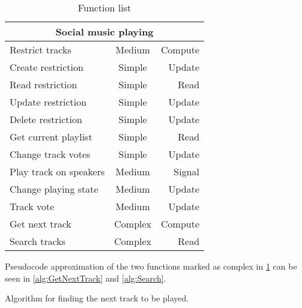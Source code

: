 \begin{table}[hbtp]
\centering
\begin{tabular}{lcr}
\toprule
\multicolumn{3}{c}{\textbf{Social music playing}} \\
\midrule
Restrict tracks                & Medium  & Compute \\
Create restriction             & Simple  & Update  \\
Read restriction               & Simple  & Read    \\
Update restriction             & Simple  & Update  \\
Delete restriction             & Simple  & Update  \\
Get current playlist           & Simple  & Read    \\
Change track votes             & Simple  & Update  \\
Play track on speakers         & Medium  & Signal  \\
Change playing state           & Medium  & Update  \\
Track vote                     & Medium  & Update  \\
Get next track                 & Complex & Compute \\
Search tracks                  & Complex & Read    \\
\bottomrule
\end{tabular}
\caption{Function list}
\label{table:functionlist}
\end{table}

Pseudocode approximation of the two functions marked as complex in \cref{table:functionlist} can be seen in \cref{alg:GetNextTrack} and \cref{alg:Search}.

\begin{algorithm}[htbp]
\caption{Algorithm for finding the next track to be played.}\label{alg:GetNextTrack}
\begin{algorithmic}[1]
		\EndIf{}
			\Else{} 
					\EndIf{}
				\EndIf{}
			\EndIf{}
		\EndFor{}
	\EndFunction{}
\end{algorithmic}
\end{algorithm}

